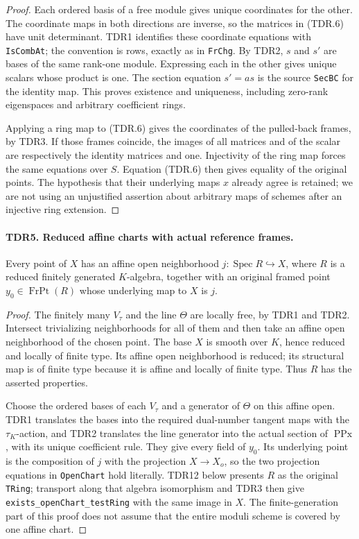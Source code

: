 \begin{proof}
Each ordered basis of a free module gives unique coordinates for
the other.  The coordinate maps in both directions are inverse,
so the matrices in (TDR.6) have unit determinant.  TDR1 identifies
these coordinate equations with \texttt{IsCombAt}; the convention
is rows, exactly as in \texttt{FrChg}.  By TDR2, \(s\) and \(s'\)
are bases of the same rank-one module.  Expressing each in the other
gives unique scalars whose product is one.  The section equation
\(s'=a s\) is the source \texttt{SecBC} for the identity map.
This proves existence and uniqueness, including zero-rank
eigenspaces and arbitrary coefficient rings.

Applying a ring map to (TDR.6) gives the coordinates of the
pulled-back frames, by TDR3.  If those frames coincide, the images
of all matrices and of the scalar are respectively the identity
matrices and one.  Injectivity of the ring map forces the same
equations over \(S\).  Equation (TDR.6) then gives equality of
the original points.  The hypothesis that their underlying maps
\(x\) already agree is retained; we are not using an unjustified
assertion about arbitrary maps of schemes after an injective ring
extension.
\end{proof}

\paragraph{TDR5. Reduced affine charts with actual reference frames.}
\label{claim:TDR5}
Every point of \(X\) has an affine open neighborhood
\(j:\operatorname{Spec}R\hookrightarrow X\), where \(R\) is
a reduced finitely generated \(K\)-algebra, together with an
original framed point \(y_0\in\operatorname{FrPt}(R)\) whose
underlying map to \(X\) is \(j\).

\begin{proof}
The finitely many \(V_\tau\) and the line \(\Theta\) are locally
free, by TDR1 and TDR2.  Intersect trivializing neighborhoods for
all of them and then take an affine open neighborhood of the chosen
point.  The base \(X\) is smooth over \(K\), hence reduced and
locally of finite type.  Its affine open neighborhood is reduced;
its structural map is of finite type because it is affine and
locally of finite type.  Thus \(R\) has the asserted properties.

Choose the ordered bases of each \(V_\tau\) and a generator of
\(\Theta\) on this affine open.  TDR1 translates the bases into
the required dual-number tangent maps with the \(\tau_K\)-action,
and TDR2 translates the line generator into the actual section of
\(\operatorname{PPx}\), with its unique coefficient rule.
They give every field of \(y_0\).  Its underlying point is the
composition of \(j\) with the projection \(X\to X_o\), so the
two projection equations in \texttt{OpenChart} hold literally.
TDR12 below presents \(R\) as the original \texttt{TRing};
transport along that algebra isomorphism and TDR3 then give
\texttt{exists\_openChart\_testRing} with the same image in \(X\).
The finite-generation part of this proof does not assume that
the entire moduli scheme is covered by one affine chart.
\end{proof}

